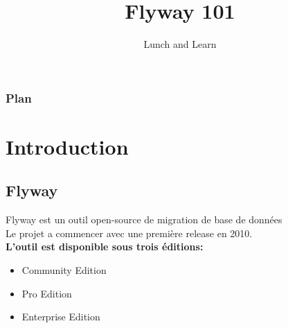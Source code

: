 \documentclass[slidestop,compress,11pt,xcolor=dvipsnames,french]{beamer}
\title[Flyway 101]{Flyway 101}
\author[Lunch and Learn]{\Large Lunch and Learn}
\date[Septembre 2020]{\normalsize
\begin{center}
\parbox{0cm}{\begin{tabbing}
\hspace*{2cm}\= \kill
Auteur :\> Said Mezghanni
\end{tabbing}}
\end{center}
}
\institute{L'équipe du PaaP}
\let\otp\titlepage
\renewcommand{\titlepage}{\otp\addtocounter{framenumber}{-1}}
\begin{document}
\begin{frame}[plain]
\titlepage
\end{frame}
\setcounter{framenumber}{0}
\begin{frame}
  \frametitle{Plan}

  \tableofcontents
\end{frame}
\section{Introduction}
\subsection*{Flyway}
\begin{frame}

Flyway est un outil open-source de migration de base de données \\ 
Le projet a commencer avec une première release en 2010. \\

\vspace{1cm}
\textbf {L'outil est disponible sous trois éditions:  \\}
    \begin{itemize}
        \item Community Edition
        \item Pro Edition 
        \item Enterprise Edition
    \end{itemize}
\end{frame}
\end{document}
